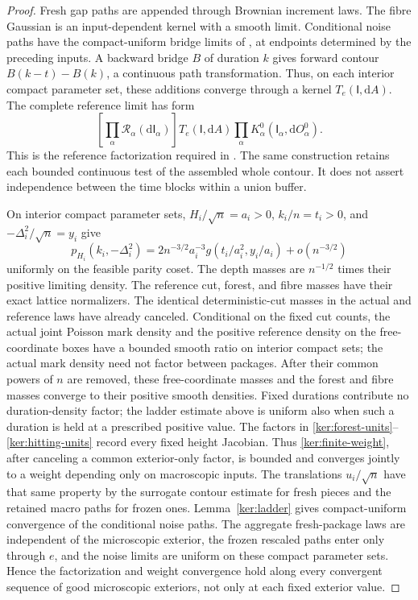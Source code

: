 \documentclass[11pt]{article}
\numberwithin{equation}{section}
\theoremstyle{definition}
\theoremstyle{remark}
\newcommand{\dd}{\mathrm d}
\newcommand{\1}{\mathbf 1}
\begin{document}
\begin{proof}
Fresh gap paths are appended through Brownian increment laws.
The fibre Gaussian is an input-dependent kernel with a smooth limit.
Conditional noise paths have the compact-uniform bridge limits of
, at endpoints determined by the preceding inputs.
A backward bridge \(B\) of duration \(k\) gives forward contour
\(B(k-t)-B(k)\), a continuous path transformation. Thus, on each
interior compact parameter set, these additions converge through a
kernel \(T_e(\mathsf I,\dd A)\). The complete reference limit has form
\begin{equation}\label{ker:augmented-reference-limit}
 \left[\prod_\alpha\mathcal R_\alpha(\dd\mathsf I_\alpha)\right]
 T_e(\mathsf I,\dd A)
 \prod_\alpha K^0_\alpha(\mathsf I_\alpha,\dd O^0_\alpha).
\end{equation}
This is the reference factorization required in
. The same construction retains each bounded
continuous test of the assembled whole contour. It does not assert
independence between the time blocks within a union buffer.

On interior compact parameter sets, \(H_i/\sqrt n=a_i>0\),
\(k_i/n=t_i>0\), and \(-\Delta_i^2/\sqrt n=y_i\) give
\[
 p_{H_i}(k_i,-\Delta_i^2)
 =2n^{-3/2}a_i^{-3}g(t_i/a_i^2,y_i/a_i)+o(n^{-3/2})
\]
uniformly on the feasible parity coset.  The depth masses are
\(n^{-1/2}\) times their positive limiting density. The reference
cut, forest, and fibre masses have their exact lattice normalizers.
The identical deterministic-cut masses in the actual and reference
laws have already canceled. Conditional on the fixed cut counts,
the actual joint Poisson mark density and the positive reference
density on the free-coordinate boxes have a bounded smooth ratio
on interior compact sets; the actual mark density need not factor
between packages. After their common powers of \(n\) are removed,
these free-coordinate masses and the forest and fibre masses
converge to their positive smooth densities. Fixed durations
contribute no duration-density factor; the ladder estimate above is
uniform also when such a duration is held at a prescribed positive
value. The factors in
\eqref{ker:forest-units}--\eqref{ker:hitting-units} record every fixed
height Jacobian.  Thus \eqref{ker:finite-weight}, after canceling a
common exterior-only factor, is bounded and converges jointly to a
weight depending only on macroscopic inputs.  The translations
\(u_i/\sqrt n\) have that same property by the surrogate contour
estimate for fresh pieces and the retained macro paths for frozen
ones.  Lemma~\ref{ker:ladder} gives compact-uniform convergence of
the conditional noise paths. The aggregate fresh-package laws are
independent of the microscopic exterior, the frozen rescaled paths enter only through \(e\), and the
noise limits are uniform on these compact parameter sets. Hence the
factorization and weight convergence hold along every convergent
sequence of good microscopic exteriors, not only at each fixed
exterior value.


\end{proof}
\end{document}

